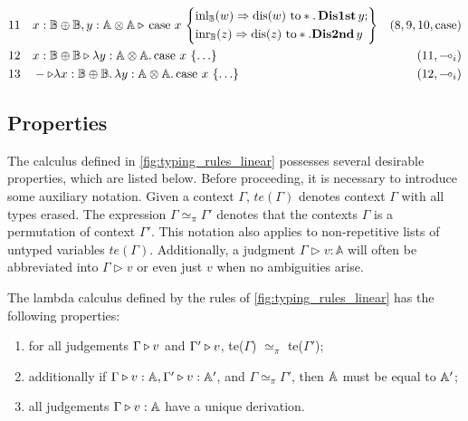 \begin{example}
\begin{equation*}
\begin{split}
11 \hspace{10 pt} &    x: \mathbb{\mathbb{B} \oplus \mathbb{B}},  y: \mathbb{A \otimes A} \triangleright \, 
\text{case } x \,  
  \left\{
    \begin{aligned} 
    &\mathrm{inl}_{\mathbb{B}}(w) \Rightarrow \text{dis}(w) \text{ to} * . \, \textbf{Dis1st} \, y; \\
    &\mathrm{inr}_{\mathbb{B}}(z) \Rightarrow  \text{dis}(z) \text{ to} *. \textbf{Dis2nd} \, y   \\ 
  \end{aligned}  
  \right\}  & \text{($8,9,10,\text{case}$)} \\
12 \hspace{10 pt} & x: \mathbb{\mathbb{B} \oplus \mathbb{B}} \triangleright \lambda y: \mathbb{A \otimes A}. \, 
\text{case } x \,  
  \left\{ \ldots 
  \right\}   & \text{($11,\multimap_i$)} \\
13 \hspace{10 pt} & - \triangleright  \lambda x: \mathbb{\mathbb{B} \oplus \mathbb{B}}. \, \lambda y: \mathbb{A \otimes A}. \, 
\text{case } x \,  
  \left\{ \ldots  
  \right\}   & \text{($12,\multimap_i$)}
\end{split}
\end{equation*}
\end{example}






\subsection{Properties}


The calculus defined in \autoref{fig:typing_rules_linear} possesses several desirable properties, which are listed below. Before proceeding, it is necessary to introduce some auxiliary notation. Given a context $\Gamma$, $te(\Gamma)$ denotes context $\Gamma$ with all types erased. The expression $\Gamma \simeq_{\pi} \Gamma'$ denotes that the contexts $\Gamma$ is a permutation of context $\Gamma'$. This notation also applies to non-repetitive lists of untyped variables $te(\Gamma)$. Additionally, a judgment $\Gamma \triangleright v: \mathbb{A}$ will often be abbreviated into $\Gamma \triangleright v $ or even just $v$ when no ambiguities arise.


\begin{theorem} \label {theorem:unique_der}
   The lambda calculus defined by the rules of \autoref{fig:typing_rules_linear} has the following properties:
   \begin{enumerate}
     \item\label{perm} for all judgements $\Gamma \triangleright v$ and $\Gamma'
             \triangleright v$, te($\Gamma$) $\simeq_{\pi}$  te($\Gamma'$); 
     \item\label{type} additionally if $\Gamma \triangleright v: \mathbb{A},
       \Gamma' \triangleright v: \mathbb{A}'$, and $\Gamma \simeq_{\pi}
       \Gamma'$, then $\mathbb{A}$ must be equal to $\mathbb{A}'$;
     \item\label{der} all judgements $\Gamma \triangleright v:\mathbb{A}$ have a unique derivation.
\end{enumerate}
\end{theorem}

